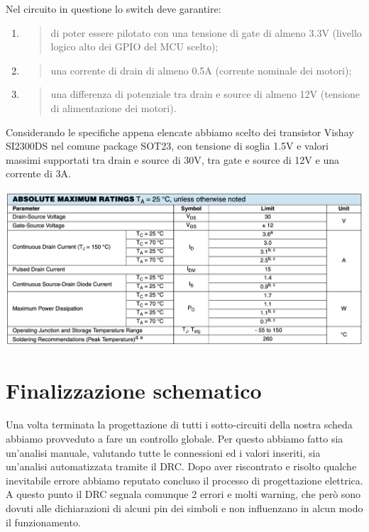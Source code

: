 \noindent Nel circuito in questione lo switch deve garantire:

\begin{enumerate}
\def\labelenumi{\arabic{enumi}.}
\item
  \begin{quote}
  di poter essere pilotato con una tensione di gate di almeno 3.3V
  (livello logico alto dei GPIO del MCU scelto);
  \end{quote}
\item
  \begin{quote}
  una corrente di drain di almeno 0.5A (corrente nominale dei motori);
  \end{quote}
\item
  \begin{quote}
  una differenza di potenziale tra drain e source di almeno 12V
  (tensione di alimentazione dei motori).
  \end{quote}
\end{enumerate}

\noindent Considerando le specifiche appena elencate abbiamo scelto dei transistor
Vishay SI2300DS nel comune package SOT23, con tensione di soglia 1.5V e
valori massimi supportati tra drain e source di 30V, tra gate e source
di 12V e una corrente di 3A.

\begin{center}
\includegraphics[scale=0.5]{figures/image69.png}
\captionsetup{type=figure}
\end{center}

\hypertarget{finalizzazione schematico}{%
\section{Finalizzazione schematico}\label{finalizzazione schematico}}

Una volta terminata la progettazione di tutti i sotto-circuiti della 
nostra scheda abbiamo provveduto a fare un controllo globale. Per questo abbiamo fatto 
sia un’analisi manuale, valutando tutte le connessioni ed i valori inseriti, sia un’analisi 
automatizzata tramite il DRC. Dopo aver riscontrato e risolto qualche inevitabile errore 
abbiamo reputato concluso il processo di progettazione elettrica. A questo punto il DRC 
segnala comunque 2 errori e molti warning, che però sono dovuti alle dichiarazioni di alcuni 
pin dei simboli e non influenzano in alcun modo il funzionamento.
